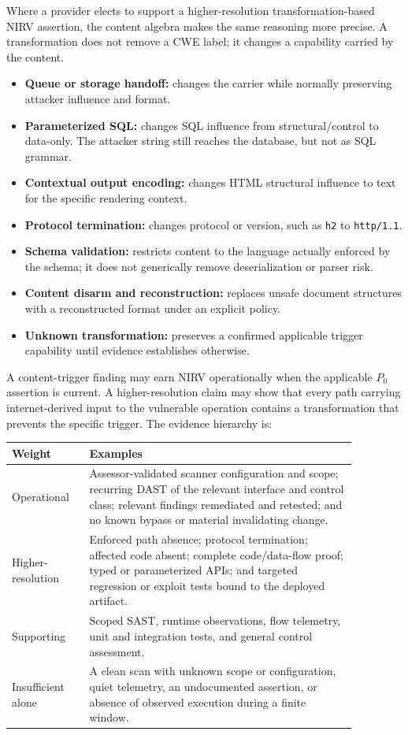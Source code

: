 \documentclass[11pt]{article}
\newcommand{\code}[1]{\texttt{#1}}
\begin{document}
Where a provider elects to support a higher-resolution transformation-based
NIRV assertion, the content algebra makes the same reasoning more precise. A
transformation does not remove a CWE label; it changes a capability carried by
the content.

\begin{itemize}[leftmargin=1.5em]
\item \textbf{Queue or storage handoff:} changes the carrier while normally
  preserving attacker influence and format.
\item \textbf{Parameterized SQL:} changes SQL influence from structural/control
  to data-only. The attacker string still reaches the database, but not as SQL
  grammar.
\item \textbf{Contextual output encoding:} changes HTML structural influence to
  text for the specific rendering context.
\item \textbf{Protocol termination:} changes protocol or version, such as
  \code{h2} to \code{http/1.1}.
\item \textbf{Schema validation:} restricts content to the language actually
  enforced by the schema; it does not generically remove deserialization or
  parser risk.
\item \textbf{Content disarm and reconstruction:} replaces unsafe document
  structures with a reconstructed format under an explicit policy.
\item \textbf{Unknown transformation:} preserves a confirmed applicable trigger
  capability until evidence establishes otherwise.
\end{itemize}

A content-trigger finding may earn NIRV operationally when the applicable
$P_0$ assertion is current. A higher-resolution claim may show that every path
carrying internet-derived input to the vulnerable operation contains a
transformation that prevents the specific trigger. The evidence hierarchy is:

\begin{center}
\renewcommand{\arraystretch}{1.2}
\small
\begin{tabular}{p{0.19\linewidth}p{0.68\linewidth}}
\toprule
\textbf{Weight} & \textbf{Examples} \\
\midrule
Operational & Assessor-validated scanner configuration and scope;
recurring DAST of the relevant interface and control class; relevant findings
remediated and retested; and no known bypass or material invalidating change. \\
Higher-resolution & Enforced path absence; protocol termination; affected code absent;
complete code/data-flow proof; typed or parameterized APIs; and targeted
regression or exploit tests bound to the deployed artifact. \\
Supporting & Scoped SAST, runtime observations, flow telemetry, unit and
integration tests, and general control assessment. \\
Insufficient alone & A clean scan with unknown scope or configuration, quiet
telemetry, an undocumented assertion, or absence of observed execution during
a finite window. \\
\bottomrule
\end{tabular}
\end{center}
\end{document}

